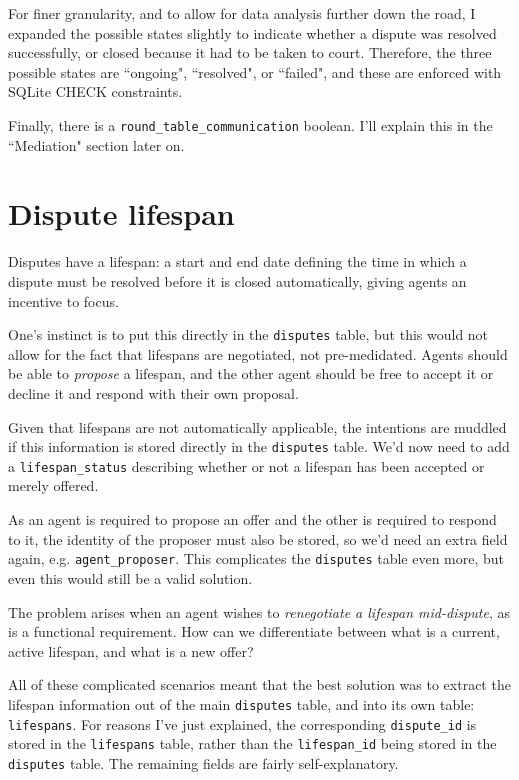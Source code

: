 For finer granularity, and to allow for data analysis further down the road, I expanded the possible states slightly to indicate whether a dispute was resolved successfully, or closed because it had to be taken to court. Therefore, the three possible states are ``ongoing", ``resolved", or ``failed", and these are enforced with SQLite CHECK constraints.

Finally, there is a \lstinline{round_table_communication} boolean. I'll explain this in the ``Mediation" section later on.

\section{Dispute lifespan}

Disputes have a lifespan: a start and end date defining the time in which a dispute must be resolved before it is closed automatically, giving agents an incentive to focus.

One's instinct is to put this directly in the \lstinline{disputes} table, but this would not allow for the fact that lifespans are negotiated, not pre-medidated. Agents should be able to \emph{propose} a lifespan, and the other agent should be free to accept it or decline it and respond with their own proposal.

Given that lifespans are not automatically applicable, the intentions are muddled if this information is stored directly in the \lstinline{disputes} table. We'd now need to add a \lstinline{lifespan_status} describing whether or not a lifespan has been accepted or merely offered.

As an agent is required to propose an offer and the other is required to respond to it, the identity of the proposer must also be stored, so we'd need an extra field again, e.g. \lstinline{agent_proposer}. This complicates the \lstinline{disputes} table even more, but even this would still be a valid solution.

The problem arises when an agent wishes to \emph{renegotiate a lifespan mid-dispute}, as is a functional requirement. How can we differentiate between what is a current, active lifespan, and what is a new offer?

All of these complicated scenarios meant that the best solution was to extract the lifespan information out of the main \lstinline{disputes} table, and into its own table: \lstinline{lifespans}. For reasons I've just explained, the corresponding \lstinline{dispute_id} is stored in the \lstinline{lifespans} table, rather than the \lstinline{lifespan_id} being stored in the \lstinline{disputes} table. The remaining fields are fairly self-explanatory.

